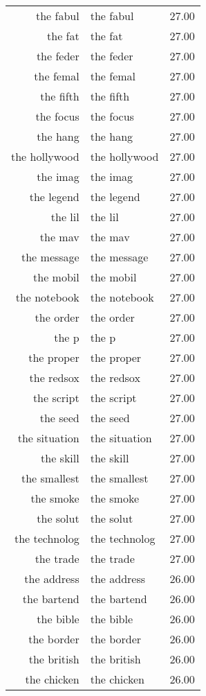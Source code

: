 \begin{table}[ht]
\begin{tabular}{rlr}
  the fabul & the fabul & 27.00 \\ 
  the fat & the fat & 27.00 \\ 
  the feder & the feder & 27.00 \\ 
  the femal & the femal & 27.00 \\ 
  the fifth & the fifth & 27.00 \\ 
  the focus & the focus & 27.00 \\ 
  the hang & the hang & 27.00 \\ 
  the hollywood & the hollywood & 27.00 \\ 
  the imag & the imag & 27.00 \\ 
  the legend & the legend & 27.00 \\ 
  the lil & the lil & 27.00 \\ 
  the mav & the mav & 27.00 \\ 
  the message & the message & 27.00 \\ 
  the mobil & the mobil & 27.00 \\ 
  the notebook & the notebook & 27.00 \\ 
  the order & the order & 27.00 \\ 
  the p & the p & 27.00 \\ 
  the proper & the proper & 27.00 \\ 
  the redsox & the redsox & 27.00 \\ 
  the script & the script & 27.00 \\ 
  the seed & the seed & 27.00 \\ 
  the situation & the situation & 27.00 \\ 
  the skill & the skill & 27.00 \\ 
  the smallest & the smallest & 27.00 \\ 
  the smoke & the smoke & 27.00 \\ 
  the solut & the solut & 27.00 \\ 
  the technolog & the technolog & 27.00 \\ 
  the trade & the trade & 27.00 \\ 
  the address & the address & 26.00 \\ 
  the bartend & the bartend & 26.00 \\ 
  the bible & the bible & 26.00 \\ 
  the border & the border & 26.00 \\ 
  the british & the british & 26.00 \\ 
  the chicken & the chicken & 26.00 \\ 

\end{tabular}
\end{table}
